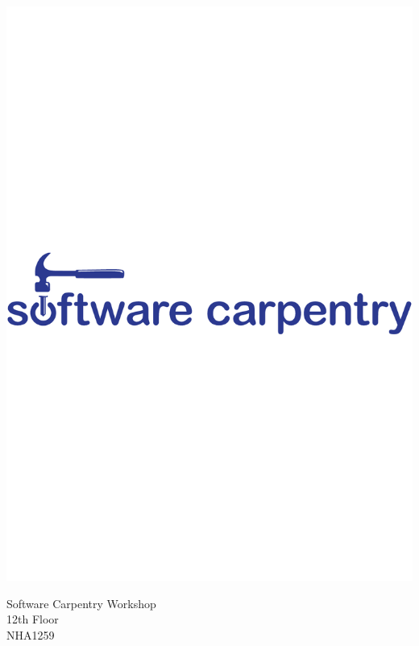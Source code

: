 \documentclass[landscape, a4paper]{article}
\begin{document}
\begin{minipage}{\linewidth}
	\vspace{-2cm}
	
	\hspace{-3cm}\includegraphics[width=1.5\linewidth]{logo_blue.pdf}
\end{minipage}
\vspace{3cm}
\begin{center}
\Huge
Software Carpentry Workshop \\
12th Floor \\
\vspace{1cm}
NHA1259
\end{center}
\end{document}
